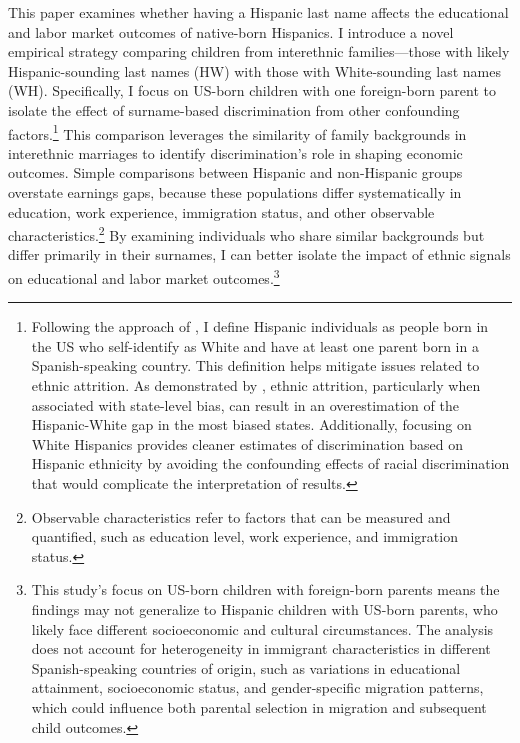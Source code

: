 This paper examines whether having a Hispanic last name affects the educational and labor market outcomes of native-born Hispanics. I introduce a novel empirical strategy comparing children from interethnic families—those with likely Hispanic-sounding last names (HW) with those with White-sounding last names (WH). Specifically, I focus on US-born children with one foreign-born parent to isolate the effect of surname-based discrimination from other confounding factors.\footnote{Following the approach of \textcite{antman2020ethnic, hadah2024effect}, I define Hispanic individuals as people born in the US who self-identify as White and have at least one parent born in a Spanish-speaking country. This definition helps mitigate issues related to ethnic attrition. As demonstrated by \textcite{hadah2024effect}, ethnic attrition, particularly when associated with state-level bias, can result in an overestimation of the Hispanic-White gap in the most biased states. Additionally, focusing on White Hispanics provides cleaner estimates of discrimination based on Hispanic ethnicity by avoiding the confounding effects of racial discrimination that would complicate the interpretation of results.} This comparison leverages the similarity of family backgrounds in interethnic marriages to identify discrimination's role in shaping economic outcomes. Simple comparisons between Hispanic and non-Hispanic groups overstate earnings gaps, because these populations differ systematically in education, work experience, immigration status, and other observable characteristics.\footnote{Observable characteristics refer to factors that can be measured and quantified, such as education level, work experience, and immigration status.} By examining individuals who share similar backgrounds but differ primarily in their surnames, I can better isolate the impact of ethnic signals on educational and labor market outcomes.\footnote{This study's focus on US-born children with foreign-born parents means the findings may not generalize to Hispanic children with US-born parents, who likely face different socioeconomic and cultural circumstances. The analysis does not account for heterogeneity in immigrant characteristics in different Spanish-speaking countries of origin, such as variations in educational attainment, socioeconomic status, and gender-specific migration patterns, which could influence both parental selection in migration and subsequent child outcomes.}

